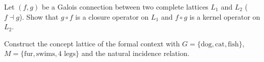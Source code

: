 \begin{exercise}
Let $(f, g)$ be a Galois connection between two complete lattices $L_1$ and $L_2$
($f \dashv g$). Show that $g \circ f$ is a closure operator on $L_1$ and $f \circ g$ is a
kernel operator on $L_2$.
\end{exercise}

\begin{exercise}
Construct the concept lattice of the formal context with
$G = \{\text{dog}, \text{cat}, \text{fish}\}$,
$M = \{\text{fur}, \text{swims}, \text{4 legs}\}$ and the natural incidence relation.
\end{exercise}
